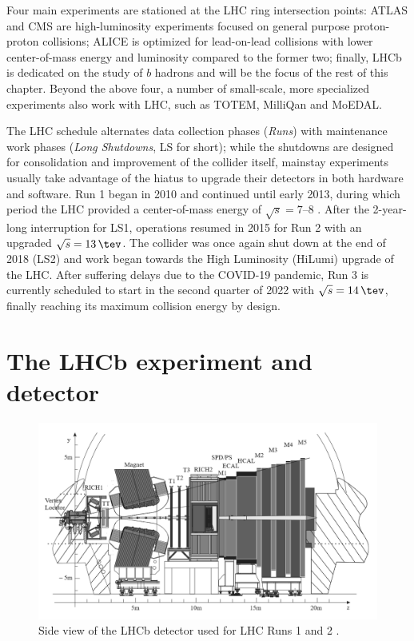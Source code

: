 Four main experiments are stationed at the LHC ring intersection points:
ATLAS and CMS are high-luminosity experiments focused on general purpose proton-proton collisions; ALICE is optimized for lead-on-lead collisions with lower center-of-mass energy and luminosity compared to the former two; finally, LHCb is dedicated on the study of $b$ hadrons and will be the focus of the rest of this chapter.
Beyond the above four, a number of small-scale, more specialized experiments also work with LHC, such as TOTEM, MilliQan and MoEDAL.

The LHC schedule alternates data collection phases (\textit{Runs}) with maintenance work phases (\textit{Long Shutdowns}, LS for short);
while the shutdowns are designed for consolidation and improvement of the collider itself, mainstay experiments usually take advantage of the hiatus to upgrade their detectors in both hardware and software.
Run 1 began in 2010 and continued until early 2013, during which period the LHC provided a center-of-mass energy of $\sqrt{s} = 7$--$8$ \si{\tev}.
After the 2-year-long interruption for LS1, operations resumed in 2015 for Run 2 with an upgraded $\sqrt{s} = \SI{13}{\tev}$.
The collider was once again shut down at the end of 2018 (LS2) and work began towards the High Luminosity (HiLumi) upgrade of the LHC.
After suffering delays due to the COVID-19 pandemic, Run 3 is currently scheduled to start in the second quarter of 2022 with $\sqrt{s} = \SI{14}{\tev}$, finally reaching its maximum collision energy by design.


\section{The LHCb experiment and detector}
\label{sec:2:lhcb_detector}

\begin{figure}[t]
	\centering
	\includegraphics[width=\textwidth]{graphics/02-lhcb/lhcb_diagram.png}
	\caption[LHCb detector side view (Runs 1 and 2).]{Side view of the LHCb detector used for LHC Runs 1 and 2 \cite{Antunes-Nobrega:630827}.}
	\label{fig:2:lhcb_diagram}
\end{figure}

